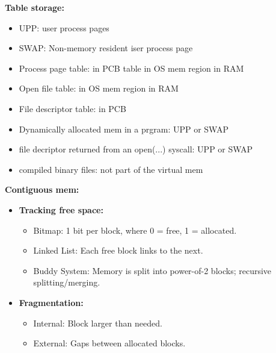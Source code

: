 \documentclass[8pt,twocolumn]{article}
\begin{document}
\textbf{Table storage:}
\vspace*{-0.8em}
\begin{itemize}
    \setlength{\itemsep}{0pt} %
    \setlength{\parskip}{0pt}
    \item UPP: user process pages
    \item SWAP: Non-memory resident iser process page 
    \item Process page table: in PCB table in OS mem region in RAM
    \item Open file table: in OS mem region in RAM
    \item File descriptor table: in PCB 
    \item Dynamically allocated mem in a prgram: UPP or SWAP
    \item file decriptor returned from an open(...) syscall: UPP or SWAP
    \item compiled binary files: not part of the virtual mem
\end{itemize}
\vspace{-0.6em}
\textbf{Contiguous mem:}
\vspace{-0.6em}
\begin{itemize}
    \setlength{\itemsep}{0pt} %
    \setlength{\parskip}{0pt}
  \item \textbf{Tracking free space:}
\vspace{-0.6em}
  \begin{itemize}
    \setlength{\itemsep}{0pt} %
    \setlength{\parskip}{0pt}
    \item Bitmap: 1 bit per block, where 0 = free, 1 = allocated.
    \item Linked List: Each free block links to the next.
    \item Buddy System: Memory is split into power-of-2 blocks; recursive splitting/merging.
  \end{itemize}
\vspace{-0.6em}
  \item \textbf{Fragmentation:}
\vspace{-0.6em}
  \begin{itemize}
    \setlength{\itemsep}{0pt} %
    \setlength{\parskip}{0pt}
    \item Internal: Block larger than needed.
    \item External: Gaps between allocated blocks.
  \end{itemize}
\vspace{-0.6em}
\end{itemize}
\end{document}
